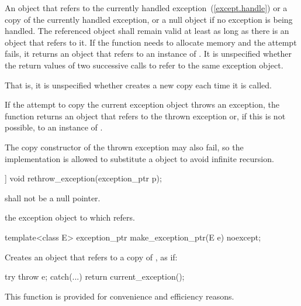 \begin{itemdescr}
\pnum
\returns An  object that refers to
the currently handled exception~(\ref{except.handle}) or a copy of the currently
handled exception, or a null  object if no exception is being
handled. The referenced object shall remain valid at least as long as there is an
 object that refers to it.
If the function needs to allocate memory and the attempt fails, it returns an
 object that refers to an instance of .
It is unspecified whether the return values of two successive calls to
 refer to the same exception object.
\begin{note} That is, it is unspecified whether 
creates a new copy each time it is called. \end{note}
If the attempt to copy the current exception object throws an exception, the function
returns an  object that refers to the thrown exception or,
if this is not possible, to an instance of . \begin{note} The
copy constructor of the thrown exception may also fail, so the implementation is allowed
to substitute a  object to avoid infinite
recursion.\end{note}
\end{itemdescr}

\begin{itemdecl}
[[noreturn]] void rethrow_exception(exception_ptr p);
\end{itemdecl}

\begin{itemdescr}
\pnum
\requires {} shall not be a null pointer.

\pnum
\throws the exception object to which  refers.
\end{itemdescr}

\begin{itemdecl}
template<class E> exception_ptr make_exception_ptr(E e) noexcept;
\end{itemdecl}

\begin{itemdescr}
\pnum
\effects Creates an  object that refers to a copy of , as if:
\begin{codeblock}
try {
  throw e;
} catch(...) {
  return current_exception();
}
\end{codeblock}

\pnum
\begin{note} This function is provided for convenience and
efficiency reasons. \end{note}
\end{itemdescr}

